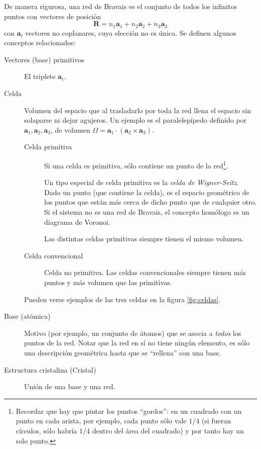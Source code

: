 De manera rigurosa, una red de Bravais es el conjunto de todos los
infinitos puntos con vectores de posición
\begin{equation}
  \mathbf{R} = n_1 \mathbf{a}_1 + n_2 \mathbf{a}_2  + n_3 \mathbf{a}_3
\end{equation}
con $\mathbf{a}_i$ vectores no coplanares, cuya elección no es
única. Se definen algunos conceptos relacionados:
\begin{description}
\item[Vectores (base) primitivos] El triplete $\mathbf{a}_i$.
\item [Celda] Volumen del espacio que al trasladarlo por toda la red
  llena el espacio sin solaparse ni dejar agujeros. Un ejemplo es el
  paralelepípedo definido por
  $\mathbf{a}_1,\mathbf{a}_2,\mathbf{a}_3$, de volumen
  $\Omega = \mathbf{a}_1 \cdot (\mathbf{a}_2 \times \mathbf{a}_3)$. 
  \begin{description}
  \item[Celda primitiva] Si una celda es primitiva, sólo contiene un
    punto de la red\footnote{Recordar que hay que pintar los puntos
      ``gordos'': en un cuadrado con un punto en cada arista, por
      ejemplo, cada punto sólo vale $1/4$ (si fueran círculos, sólo
      habría $1/4$ dentro del área del cuadrado) y por tanto hay un
      solo punto.}. 

    Un tipo especial de celda primitiva es la \emph{celda de
      Wigner-Seitz}. Dado un punto (que contiene la celda), es el
    espacio geométrico de los puntos que están más cerca de dicho
    punto que de cualquier otro. Si el sistema no es una red de
    Bravais, el concepto homólogo es un diagrama de Voronoi.
    
    Las distintas celdas primitivas siempre tienen el mismo volumen.
  \item[Celda convencional] Celda no primitiva.  Las celdas
    convencionales siempre tienen más puntos y más volumen que las
    primitivas.
  \end{description}
  Pueden verse ejemplos de las tres celdas en la figura \ref{fig:celdas}.
\item[Base (atómica)] Motivo (por ejemplo, un conjunto de átomos) que
  se asocia a \emph{todos} los puntos de la red. Notar que la red en
  sí no tiene ningún elemento, es sólo una descripción geométrica
  hasta que se ``rellena'' con una base.
\item[Estructura cristalina (Cristal)] Unión de una base y una red.
\end{description}
